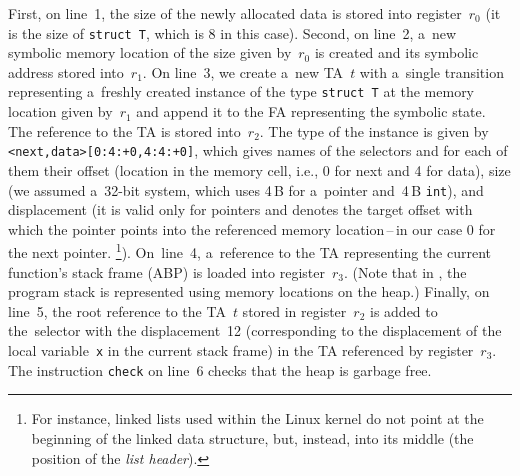 {First, on line~1, the size of the newly allocated data is stored into
register~$r_0$ (it is the size of \texttt{struct~T}, which is $8$ in this case).
Second, on line~2, a~new symbolic memory location of the size given by~$r_0$ is created
and its symbolic address stored into~$r_1$.
On line~3, we create a~new TA~$t$ with a~single transition representing
a~freshly created instance of the type \texttt{struct~T} at the memory location
given by~$r_1$ and append it to the FA representing the symbolic state.
The reference to the TA is stored into~$r_2$.
The type of the instance is given by \verb=<next,data>[0:4:+0,4:4:+0]=, which
gives names of the selectors and for each of them their offset (location in the memory cell,
i.e., 0 for next and 4 for data),
size (we assumed a~32-bit system, which uses 4\,B for a~pointer and~4\,B
\texttt{int}), and displacement (it is valid only for pointers and denotes the target offset
with which the pointer points into the referenced memory location\,--\,in our case 0 for the next pointer.%
\footnote{%
For instance, linked lists used within the Linux kernel do not point at the
beginning of the linked data structure, but, instead, into its middle (the position of
the \emph{list header}).
}).
On~line~4, a~reference to the TA representing the current function's stack frame
(ABP) is loaded into register~$r_3$.
(Note that in \forester, the program stack is represented using memory locations
on the heap.)
Finally, on line~5, the root reference to the TA~$t$ stored in register~$r_2$ is
added to the~selector with the displacement~12 (corresponding to the displacement of
the local variable~\texttt{x} in the current stack frame) in the TA referenced
by register~$r_3$.
The instruction \texttt{check} on line~6 checks that the heap is garbage free.



}
